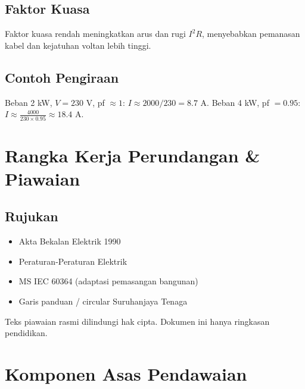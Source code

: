 \documentclass[12pt,a4paper,oneside]{scrreprt}
\newcommand{\amaran}[1]{\begin{tcolorbox}[colframe=WarnRed,title=Amaran,colback=WarnRed!3]#1\end{tcolorbox}}
\begin{document}
\section{Faktor Kuasa}
Faktor kuasa rendah meningkatkan arus dan rugi $I^2R$, menyebabkan pemanasan kabel dan kejatuhan voltan lebih tinggi.

\section{Contoh Pengiraan}
Beban 2 kW, $V=230$ V, pf $\approx 1$: $I \approx 2000/230 = 8.7$ A.  
Beban 4 kW, pf $=0.95$: $I \approx \frac{4000}{230 \times 0.95} \approx 18.4$ A.

\chapter{Rangka Kerja Perundangan \& Piawaian}
\section{Rujukan}
\begin{itemize}
  \item Akta Bekalan Elektrik 1990
  \item Peraturan-Peraturan Elektrik
  \item MS IEC 60364 (adaptasi pemasangan bangunan)
  \item Garis panduan / circular Suruhanjaya Tenaga
\end{itemize}

\amaran{Teks piawaian rasmi dilindungi hak cipta. Dokumen ini hanya ringkasan pendidikan.}

\chapter{Komponen Asas Pendawaian}
\end{document}
